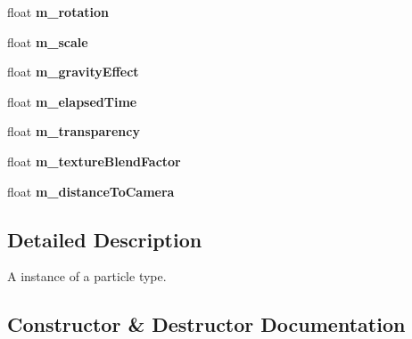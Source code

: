 \begin{DoxyCompactItemize}
float {\bfseries m\+\_\+rotation}
\item 
\mbox{\label{classflounder_1_1particle_ae8686dfaa13dcd03fa8b8ff2bc5e4df7}} 
float {\bfseries m\+\_\+scale}
\item 
\mbox{\label{classflounder_1_1particle_a89fa019cd36d5e6fa542eb33ac9b34b5}} 
float {\bfseries m\+\_\+gravity\+Effect}
\item 
\mbox{\label{classflounder_1_1particle_a828c23414722c25eb3f89b21a419440c}} 
float {\bfseries m\+\_\+elapsed\+Time}
\item 
\mbox{\label{classflounder_1_1particle_af2ceb2a4d87d3be75e37b57406ff7aee}} 
float {\bfseries m\+\_\+transparency}
\item 
\mbox{\label{classflounder_1_1particle_a01141f7b55d500f6585c222c5805c73c}} 
float {\bfseries m\+\_\+texture\+Blend\+Factor}
\item 
\mbox{\label{classflounder_1_1particle_adcb853f70ee498c3a766da5b2b25c529}} 
float {\bfseries m\+\_\+distance\+To\+Camera}
\end{DoxyCompactItemize}


\subsection{Detailed Description}
A instance of a particle type. 



\subsection{Constructor \& Destructor Documentation}
\mbox{\label{classflounder_1_1particle_a031b89de2f5f74b55cc97209229eaccd}} 
